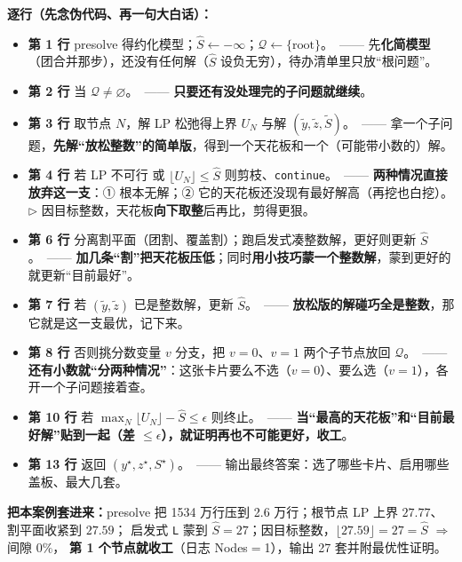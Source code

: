 \documentclass[11pt]{ctexart}
\newcommand{\code}[1]{\texttt{#1}}
\begin{document}
\textbf{逐行（先念伪代码、再一句大白话）：}
\begin{itemize}[leftmargin=1.8em,itemsep=2pt]
  \item \textbf{第 1 行} presolve 得约化模型；$\hat S\gets-\infty$；$\mathcal{Q}\gets\{\text{root}\}$。\ —— 先\textbf{化简模型}（团合并那步），还没有任何解（$\hat S$ 设负无穷），待办清单里只放“根问题”。
  \item \textbf{第 2 行} 当 $\mathcal{Q}\neq\varnothing$。\ —— \textbf{只要还有没处理完的子问题就继续}。
  \item \textbf{第 3 行} 取节点 $N$，解 LP 松弛得上界 $U_N$ 与解 $(\tilde y,\tilde z,\tilde S)$。\ —— 拿一个子问题，\textbf{先解“放松整数”的简单版}，得到一个天花板和一个（可能带小数的）解。
  \item \textbf{第 4 行} 若 LP 不可行 或 $\lfloor U_N\rfloor\le\hat S$ 则剪枝、\code{continue}。\ —— \textbf{两种情况直接放弃这一支}：① 根本无解；② 它的天花板还没现有最好解高（再挖也白挖）。$\triangleright$ 因目标整数，天花板\textbf{向下取整}后再比，剪得更狠。
  \item \textbf{第 6 行} 分离割平面（团割、覆盖割）；跑启发式凑整数解，更好则更新 $\hat S$。\ —— \textbf{加几条“割”把天花板压低}；同时\textbf{用小技巧蒙一个整数解}，蒙到更好的就更新“目前最好”。
  \item \textbf{第 7 行} 若 $(\tilde y,\tilde z)$ 已是整数解，更新 $\hat S$。\ —— \textbf{放松版的解碰巧全是整数}，那它就是这一支最优，记下来。
  \item \textbf{第 8 行} 否则挑分数变量 $v$ 分支，把 $v{=}0$、$v{=}1$ 两个子节点放回 $\mathcal{Q}$。\ —— \textbf{还有小数就“分两种情况”}：这张卡片要么不选（$v{=}0$）、要么选（$v{=}1$），各开一个子问题接着查。
  \item \textbf{第 10 行} 若 $\max_N\lfloor U_N\rfloor-\hat S\le\epsilon$ 则终止。\ —— \textbf{当“最高的天花板”和“目前最好解”贴到一起（差 $\le\epsilon$），就证明再也不可能更好，收工}。
  \item \textbf{第 13 行} 返回 $(y^\star,z^\star,S^\star)$。\ —— 输出最终答案：选了哪些卡片、启用哪些盖板、最大几套。
\end{itemize}
\begin{key}\textbf{把本案例套进来：}presolve 把 1534 万行压到 2.6 万行；根节点 LP 上界 $27.77$、割平面收紧到 $27.59$；
启发式 \code{L} 蒙到 $\hat S{=}27$；因目标整数，$\lfloor27.59\rfloor{=}27{=}\hat S$ $\Rightarrow$ 间隙 $0\%$，
\textbf{第 1 个节点就收工}（日志 Nodes$=$1），输出 27 套并附最优性证明。
\end{key}

\end{document}
